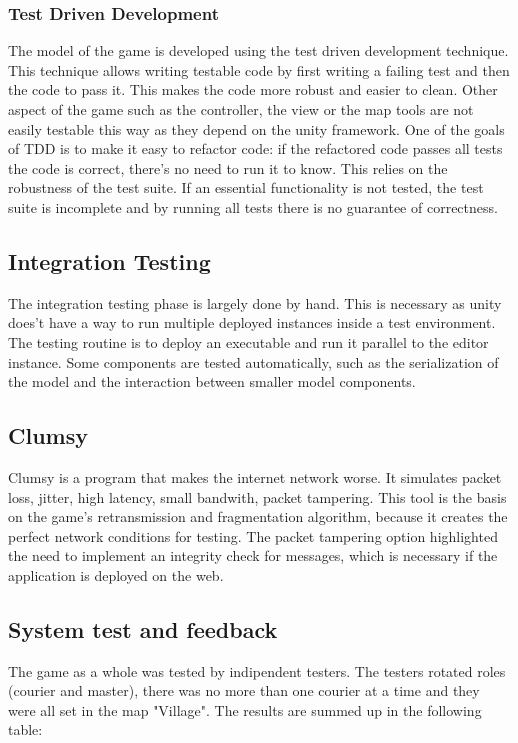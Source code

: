 \documentclass[12pt]{article}
\begin{document}
\subsubsection {Test Driven Development \cite{tdd}} 
The model of the game is developed using the test driven development technique. This technique allows writing testable code by first writing a failing test and then the code to pass it. This makes the code more robust and easier to clean. Other aspect of the game such as the controller, the view or the map tools are not easily testable this way as they depend on the unity framework. One of the goals of TDD is to make it easy to refactor code: if the refactored code passes all tests the code is correct, there's no need to run it to know. This relies on the robustness of the test suite. If an essential functionality is not tested, the test suite is incomplete and by running all tests there is no guarantee of correctness.
\subsection{Integration Testing}
The integration testing phase is largely done by hand. This is necessary as unity does't have a way to run multiple deployed instances inside a test environment. The testing routine is to deploy an executable and run it parallel to the editor instance. Some components are tested automatically, such as the serialization of the model and the interaction between smaller model components.
\subsection{Clumsy \cite{clumsy}}
Clumsy is a program that makes the internet network worse. It simulates packet loss, jitter, high latency, small bandwith, packet tampering. This tool is the basis on the game's retransmission and fragmentation algorithm, because it creates the perfect network conditions for testing. The packet tampering option highlighted the need to implement an integrity check for messages, which is necessary if the application is deployed on the web.

\subsection{System test and feedback}
The game as a whole was tested by indipendent testers. The testers rotated roles (courier and master), there was no more than one courier at a time and they were all set in the map "Village". The results are summed up in the following table:
\end{document}
